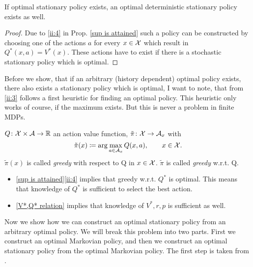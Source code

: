 \begin{corollary}\label{opt stat => opt det stat}
	If optimal stationary policy exists, an optimal deterministic stationary policy exists as well. 
\end{corollary}
\begin{proof}
	Due to \ref{ii:4} in Prop. \ref{sup is attained} such a policy can be constructed by choosing one of the actions \(a\) for every \(x\in\mathcal{X}\) which result in \(Q^*(x,a)=V^*(x)\). These actions have to exist if there is a stochastic stationary policy which is optimal.
\end{proof}

	Before we show, that if an arbitrary (history dependent) optimal policy exists, there also exists a stationary policy which is optimal, I want to note, that from \ref{ii:3} follows a first heuristic for finding an optimal policy. This heuristic only works of course, if the maximum exists. But this is never a problem in finite MDPs. 
\begin{definition}
	\(Q\colon\mathcal{X}\times\mathcal{A}\to\mathbb{R}\) an action value function, \(\tilde{\pi}\colon\mathcal{X}\to\mathcal{A}_x\) with
	\[
	\tilde{\pi}(x)\coloneqq\arg\max_{a\in\mathcal{A}_x} Q(x,a),\qquad x\in\mathcal{X}.
	\]
	\(\tilde{\pi}(x)\) is called \emph{greedy} with respect to Q in \(x\in\mathcal{X}\).
	\(\tilde{\pi}\) is called \emph{greedy} w.r.t. Q.
\end{definition}

\begin{remark}\leavevmode
	\begin{itemize}
	\item \ref{sup is attained}\ref{ii:4} implies that greedy w.r.t. \(Q^*\) is optimal. 
	This means that knowledge of \(Q^*\) is sufficient to select the best action.
	\item \ref{V*,Q* relation} implies that knowledge of \(V^*,r,p\) is sufficient as well.
	\end{itemize}
\end{remark}

Now we show how we can construct an optimal stationary policy from an arbitrary optimal policy. We will break this problem into two parts. First we construct an optimal Markovian policy, and then we construct an optimal stationary policy from the optimal Markovian policy. The first step is taken from \textcite[134-137]{putermanMarkovDecisionProcesses2005}.

